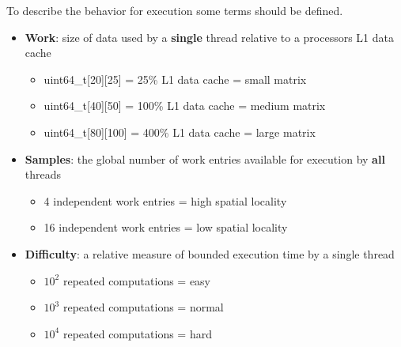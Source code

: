 \documentclass[11pt]{article}
\begin{document}
To describe the behavior for execution some terms should be defined.
\begin{itemize}
	\item \textbf{Work}: size of data used by a \textbf{single} thread relative to a processors L1 data cache
	\begin{itemize}
		\item uint64\_t[20][25] 	= 25\% L1 data cache	= small matrix
		\item uint64\_t[40][50] 	= 100\% L1 data cache	= medium matrix
		\item uint64\_t[80][100] 	= 400\% L1 data cache	= large matrix
	\end{itemize}
	\item \textbf{Samples}: the global number of work entries available for execution by \textbf{all} threads
	\begin{itemize}
		\item 4 independent work entries 	= high spatial locality
		\item 16 independent work entries 	= low spatial locality
	\end{itemize}
	\item \textbf{Difficulty}: a relative measure of bounded execution time by a single thread
	\begin{itemize}
		\item $10^2$ repeated computations = easy
		\item $10^3$ repeated computations = normal
		\item $10^4$ repeated computations = hard
	\end{itemize}
\end{itemize}
\end{document}
